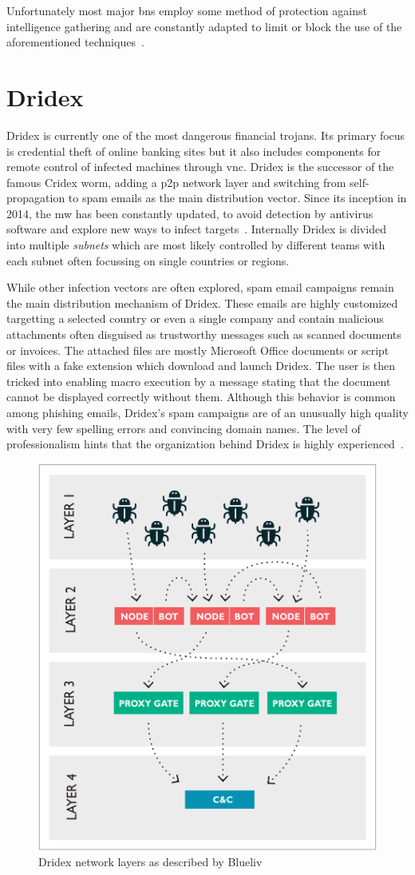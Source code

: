 Unfortunately most major \glspl{bn} employ some method of protection against intelligence gathering and are constantly adapted to limit or block the use of the aforementioned techniques~\cite{rossow2013sok, yan2011ratbot}.


\section{Dridex\label{sec:Related_work::Dridex}}
Dridex is currently one of the most dangerous financial trojans.
Its primary focus is credential theft of online banking sites but it also includes components for remote control of infected machines through \gls{vnc}.
Dridex is the successor of the famous Cridex worm, adding a \gls{p2p} network layer and switching from self-propagation to spam emails as the main distribution vector.
Since its inception in 2014, the \gls{mw} has been constantly updated, to avoid detection by antivirus software and explore new ways to infect targets~\cite{ramos2016dridex, proofpoint2017dridex, teo2015learning, tokazowski2016dridex}.
Internally Dridex is divided into multiple \emph{subnets} which are most likely controlled by different teams with each subnet often focussing on single countries or regions.

While other infection vectors are often explored, spam email campaigns remain the main distribution mechanism of Dridex.
These emails are highly customized targetting a selected country or even a single company and contain malicious attachments often disguised as trustworthy messages such as scanned documents or invoices.
The attached files are mostly Microsoft Office documents or script files with a fake extension which download and launch Dridex.
The user is then tricked into enabling macro execution by a message stating that the document cannot be displayed correctly without them.
Although this behavior is common among phishing emails, Dridex's spam campaigns are of an unusually high quality with very few spelling errors and convincing domain names.
The level of professionalism hints that the organization behind Dridex is highly experienced~\cite{obrien2016dridex}.

\begin{figure}
    \centering
    \includegraphics[width=.5\textwidth]{img/dridex_layers}
    \caption[Dridex network layers]{Dridex network layers as described by Blueliv~\cite[Fig. 12]{blueliv2015chasing}\label{fig:Dridex::Network_layers}}
\end{figure}

